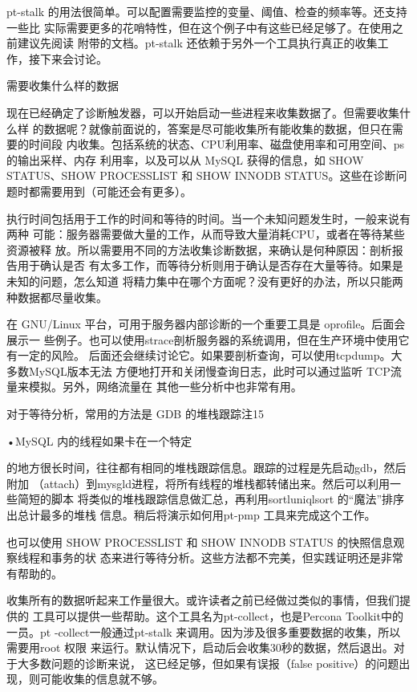 {pt-stalk 的用法很简单。可以配置需要监控的变量、阈值、检查的频率等。还支持一些比
实际需要更多的花哨特性，但在这个例子中有这些已经足够了。在使用之前建议先阅读
附带的文档。pt-stalk 还依赖于另外一个工具执行真正的收集工作，接下来会讨论。

需要收集什么样的数据

现在已经确定了诊断触发器，可以开始启动一些进程来收集数据了。但需要收集什么样
的数据呢？就像前面说的，答案是尽可能收集所有能收集的数据，但只在需要的时间段
内收集。包括系统的状态、CPU利用率、磁盘使用率和可用空间、ps的输出采样、内存
利用率，以及可以从 MySQL 获得的信息，如 SHOW STATUS、SHOW PROCESSLIST 和 SHOW
INNODB STATUS。这些在诊断问题时都需要用到（可能还会有更多）。

执行时间包括用于工作的时间和等待的时间。当一个未知问题发生时，一般来说有两种
可能：服务器需要做大量的工作，从而导致大量消耗CPU，或者在等待某些资源被释
放。所以需要用不同的方法收集诊断数据，来确认是何种原因：剖析报告用于确认是否
有太多工作，而等待分析则用于确认是否存在大量等待。如果是未知的问题，怎么知道
将精力集中在哪个方面呢？没有更好的办法，所以只能两种数据都尽量收集。

在 GNU/Linux 平台，可用于服务器内部诊断的一个重要工具是 oprofile。后面会展示一
些例子。也可以使用strace剖析服务器的系统调用，但在生产环境中使用它有一定的风险。
后面还会继续讨论它。如果要剖析查询，可以使用tcpdump。大多数MySQL版本无法
方便地打开和关闭慢查询日志，此时可以通过监听 TCP流量来模拟。另外，网络流量在
其他一些分析中也非常有用。

对于等待分析，常用的方法是 GDB 的堆栈跟踪注15

•MySQL 内的线程如果卡在一个特定

的地方很长时间，往往都有相同的堆栈跟踪信息。跟踪的过程是先启动gdb，然后附加
（attach）到mysgld进程，将所有线程的堆栈都转储出来。然后可以利用一些简短的脚本
将类似的堆栈跟踪信息做汇总，再利用sortluniqlsort 的“魔法”排序出总计最多的堆栈
信息。稍后将演示如何用pt-pmp 工具来完成这个工作。

也可以使用 SHOW PROCESSLIST 和 SHOW INNODB STATUS 的快照信息观察线程和事务的状
态来进行等待分析。这些方法都不完美，但实践证明还是非常有帮助的。

收集所有的数据听起来工作量很大。或许读者之前已经做过类似的事情，但我们提供的
工具可以提供一些帮助。这个工具名为pt-collect，也是Percona Toolkit中的一员。pt
-collect一般通过pt-stalk 来调用。因为涉及很多重要数据的收集，所以需要用root 权限
来运行。默认情况下，启动后会收集30秒的数据，然后退出。对于大多数问题的诊断来说，
这已经足够，但如果有误报（false positive）的问题出现，则可能收集的信息就不够。

}
